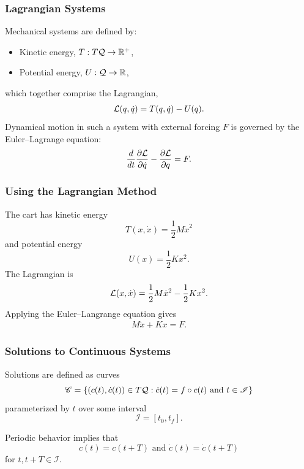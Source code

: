 \begin{frame}
  \frametitle{Lagrangian Systems}
  Mechanical systems are defined by:
  \begin{itemize}
  \item Kinetic energy, $T : T\mathcal{Q} \to \mathbb{R}^+$,
  \item Potential energy, $U : \mathcal{Q} \to \mathbb{R}$,
  \end{itemize}
  which together comprise the Lagrangian,
  \begin{align*}
    \mathcal{L}(q, \dot q) = T(q, \dot q) - U(q).
  \end{align*}
  Dynamical motion in such a system with external forcing $F$ is governed by the Euler--Lagrange equation:
  \begin{align*}
    \frac{d}{dt} \frac{\partial{\ensuremath{\mathcal{L}}}}{\partial{\ensuremath{\dot q}}} - \frac{\partial{\ensuremath{\mathcal{L}}}}{\partial{\ensuremath{q}}} = F.
  \end{align*}
\end{frame}

\begin{frame}
  \frametitle{Using the Lagrangian Method}
  The cart has kinetic energy $$T(x, {\dot x}) = \frac{1}{2} M {\dot x}^2$$ and potential energy $$U(x) = \frac{1}{2} K x^{2}.$$
  The Lagrangian is
  \begin{align*}
    \mathcal{L}(x, {\dot x}) = \frac{1}{2} M {\dot x}^2 - \frac{1}{2} K x^{2}.
  \end{align*}
  Applying the Euler--Langrange equation gives
  \begin{align*}
    M {\ddot x} + K x = F.
  \end{align*}
\end{frame}

\begin{frame}
  \frametitle{Solutions to Continuous Systems}
  Solutions are defined as curves $$\mathscr{C} = \left\{ (c(t), {\dot c(t)}) \in T\mathcal{Q} : \dot c(t) = f \circ c(t) \mbox{ and } t \in \mathscr{I} \right\}$$ parameterized by $t$ over some interval $$\mathscr{I} = [t_0, t_f].$$

  Periodic behavior implies that $$c(t) = c(t + T) \mbox{ and } {\dot c}(t) = {\dot c}(t + T)$$ for $t, t + T \in \mathscr{I}$.
\end{frame}

